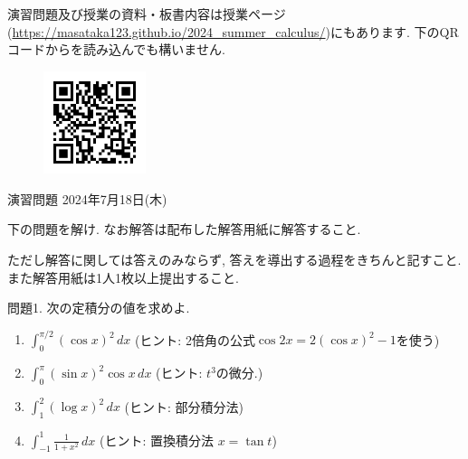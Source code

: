 \documentclass[dvipdfmx,a4paper,11pt]{article}
\theoremstyle{definition}
\begin{document}
演習問題及び授業の資料・板書内容は授業ページ(\url{https://masataka123.github.io/2024_summer_calculus/})にもあります. 
下のQRコードからを読み込んでも構いません.
 \vspace{11pt}
\begin{figure}[h]
  \centering
 \includegraphics[height=30mm, width=30mm]{calculus.png}
\end{figure}




\newpage 



\begin{center}
{\Large 演習問題  2024年7月18日(木) } 
\end{center}




\begin{center}
 {\large 下の問題を解け. なお解答は配布した解答用紙に解答すること.}
  \end{center}
 ただし解答に関しては答えのみならず, 答えを導出する過程をきちんと記すこと. 
 また解答用紙は1人1枚以上提出すること.
 
  \vspace{11pt}
  問題1.  次の定積分の値を求めよ. 
  \begin{enumerate}
 \item   $\int_0^{\pi/2} (\cos x)^2 \, dx$ (ヒント: 2倍角の公式$\cos2x = 2(\cos x)^2 -1$を使う)
 \item $ \int_0^{\pi} (\sin x)^2 \cos x \, dx$ (ヒント: $t^3$の微分.)
 \item   $\int_1^2 (\log x)^2 \, dx $ (ヒント: 部分積分法)
 \item$ \int_{-1}^{1} \frac{1}{1 + x^2} \, dx$ (ヒント: 置換積分法 $x = \tan t$)
  \end{enumerate}
\end{document}
